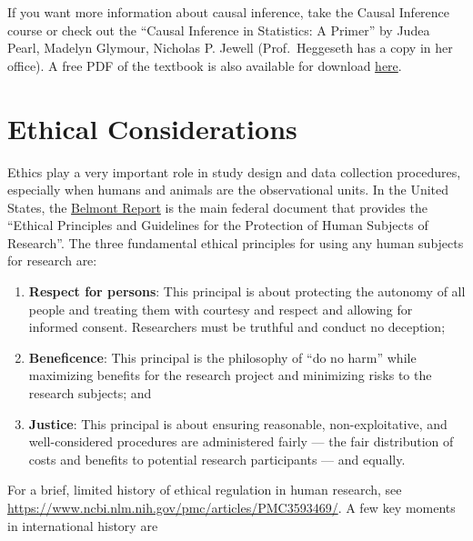 \documentclass[]{book}
\begin{document}
If you want more information about causal inference, take the Causal Inference course or check out the ``Causal Inference in Statistics: A Primer'' by Judea Pearl, Madelyn Glymour, Nicholas P. Jewell (Prof.~Heggeseth has a copy in her office). A free PDF of the textbook is also available for download \href{http://bayes.cs.ucla.edu/PRIMER/}{here}.

\hypertarget{ethical-considerations}{%
\section{Ethical Considerations}\label{ethical-considerations}}

Ethics play a very important role in study design and data collection procedures, especially when humans and animals are the observational units. In the United States, the \href{https://www.hhs.gov/ohrp/regulations-and-policy/belmont-report/index.html}{Belmont Report} is the main federal document that provides the ``Ethical Principles and Guidelines for the Protection of Human Subjects of Research''. The three fundamental ethical principles for using any human subjects for research are:

\begin{enumerate}
\def\labelenumi{\arabic{enumi}.}
\item
  \textbf{Respect for persons}: This principal is about protecting the autonomy of all people and treating them with courtesy and respect and allowing for informed consent. Researchers must be truthful and conduct no deception;
\item
  \textbf{Beneficence}: This principal is the philosophy of ``do no harm'' while maximizing benefits for the research project and minimizing risks to the research subjects; and
\item
  \textbf{Justice}: This principal is about ensuring reasonable, non-exploitative, and well-considered procedures are administered fairly --- the fair distribution of costs and benefits to potential research participants --- and equally.
\end{enumerate}

For a brief, limited history of ethical regulation in human research, see \url{https://www.ncbi.nlm.nih.gov/pmc/articles/PMC3593469/}. A few key moments in international history are
\end{document}
